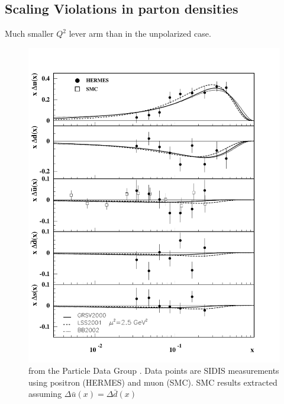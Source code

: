 \subsection{Scaling Violations in parton densities}

Much smaller $Q^2$ lever arm than in the unpolarized case.

\begin{figure}
  \includegraphics[width=1.0\textwidth]{figures/pol_pdf_5}
  \caption{from the Particle Data Group \cite{Amsler:2008zzb}.  Data points are SIDIS measurements using positron (HERMES) and muon (SMC).  SMC results extracted assuming $\Delta \bar u(x) = \Delta \bar d(x)$}
  \label{fig:pol_pdf_5}
\end{figure}

